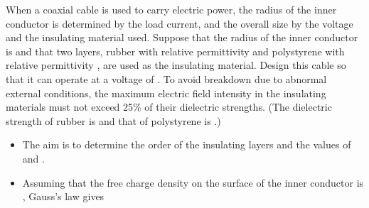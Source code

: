 
\begin{ELexample}{}

When a coaxial cable is used to carry electric power, the radius of the inner conductor is determined by the load current, and the overall size by the voltage and the insulating material used. Suppose that the radius of the inner conductor is  and that two layers, rubber with relative permittivity  and polystyrene with relative permittivity , are used as the insulating material. Design this cable so that it can operate at a voltage of . To avoid breakdown due to abnormal external conditions, the maximum electric field intensity in the insulating materials must not exceed 25\% of their dielectric strengths. (The dielectric strength of rubber is  and that of polystyrene is .)


\begin{ELsolution}

\begin{itemize}
\tightlist
\item
  The aim is to determine the order of the insulating layers and the values of  and .
\item
  Assuming that the free charge density on the surface of the inner conductor is , Gauss's law gives
\end{itemize}



\end{ELsolution}
\end{ELexample}
